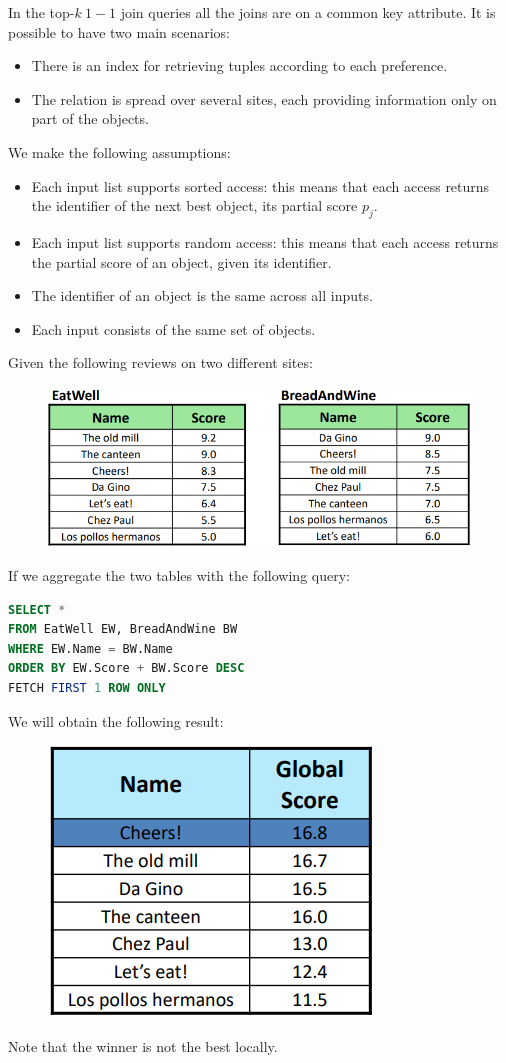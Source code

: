 \documentclass[12pt, a4paper]{report}
\newtheorem[style=M,bodystyle=\normalfont]{theorem}{Theorem}
\newtheorem[style=M,bodystyle=\normalfont]{corollary}{Corollary}
\newtheorem[style=M,bodystyle=\normalfont]{lemma}{Lemma}
\newtheorem[style=M,bodystyle=\normalfont]{definition}{Definition}
\begin{document}
    In the top-$k \: 1-1$ join queries all the joins are on a common key attribute. It is possible to have two main scenarios: 
    \begin{itemize}
        \item There is an index for retrieving tuples according to each preference. 
        \item The relation is spread over several sites, each providing information only on part of the objects.
    \end{itemize}
    We make the following assumptions: 
    \begin{itemize}
        \item Each input list supports sorted access: this means that each access returns the identifier of the next best object, its partial score $p_j$. 
        \item Each input list supports random access: this means that each access returns the partial score of an object, given its identifier. 
        \item The identifier of an object is the same across all inputs. 
        \item Each input consists of the same set of objects. 
    \end{itemize}
    \begin{example}
        Given the following reviews on two different sites: 
        \begin{figure}[H]
            \centering
            \includegraphics[width=0.75\linewidth]{images/111query.png}
        \end{figure}
        If we aggregate the two tables with the following query: 
        \begin{lstlisting}[language=SQL]
SELECT *
FROM EatWell EW, BreadAndWine BW
WHERE EW.Name = BW.Name
ORDER BY EW.Score + BW.Score DESC
FETCH FIRST 1 ROW ONLY 
        \end{lstlisting}
        We will obtain the following result: 
        \begin{figure}[H]
            \centering
            \includegraphics[width=0.4\linewidth]{images/111queryres.png}
        \end{figure}
        Note that the winner is not the best locally. 
    \end{example}
\end{document}
